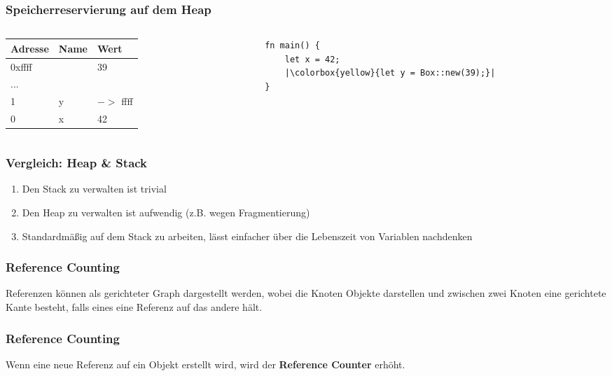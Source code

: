 \documentclass{beamer}
\begin{document}
\begin{frame}[fragile]
	\frametitle{Speicherreservierung auf dem Heap}
	\begin{columns}[T, c]
		\begin{column}{0.48\textwidth}
			\begin{tabular}{| l | l | l |}
				\hline
				Adresse & Name & Wert \\ \hline
				0xffff & & 39 \\ \hline
				... &   & \\ \hline
				1 & y & $->$ ffff \\ \hline
				0 & x & 42 \\ \hline
			\end{tabular}
		\end{column}
		\begin{column}{0.48\textwidth}
			\begin{verbatim}
fn main() {
	let x = 42;
	|\colorbox{yellow}{let y = Box::new(39);}|
}
			\end{verbatim}
		\end{column}
	\end{columns}
\end{frame}
\begin{frame}
	\frametitle{Vergleich: Heap \& Stack}
	\begin{enumerate}
		\item Den Stack zu verwalten ist trivial
		\item Den Heap zu verwalten ist aufwendig (z.B. wegen Fragmentierung)
		\item Standardmäßig auf dem Stack zu arbeiten, lässt einfacher über die Lebenszeit von Variablen nachdenken
	\end{enumerate}
\end{frame}
\begin{frame}
	\frametitle{Reference Counting}
	Referenzen können als gerichteter Graph dargestellt werden, wobei die Knoten Objekte darstellen und zwischen zwei Knoten eine gerichtete Kante besteht, falls eines eine Referenz auf das andere hält.
	\begin{figure}
		\def\svgwidth{120pt}
		\LARGE
		
	\end{figure}
\end{frame}
\begin{frame}
	\frametitle{Reference Counting}
	Wenn eine neue Referenz auf ein Objekt erstellt wird, wird der \textbf{Reference Counter} erhöht.
	\begin{figure}
		\def\svgwidth{120pt}
		\LARGE
		
	\end{figure}
\end{frame}
\end{document}

